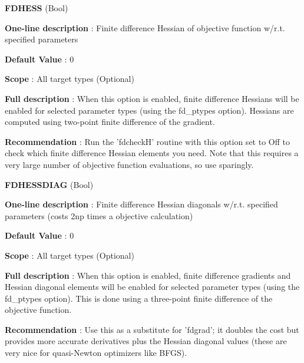 \begin{DoxyItemize}
\item {\bfseries  \-F\-D\-H\-E\-S\-S } (\-Bool) \par
{\bfseries  \-One-\/line description }\-: \-Finite difference \-Hessian of objective function w/r.\-t. specified parameters \par
{\bfseries  \-Default \-Value }\-: 0 \par
{\bfseries  \-Scope }\-: \-All target types (\-Optional) \par
{\bfseries  \-Full description }\-: \-When this option is enabled, finite difference \-Hessians will be enabled for selected parameter types (using the fd\-\_\-ptypes option). \-Hessians are computed using two-\/point finite difference of the gradient. \par
{\bfseries  \-Recommendation }\-: \-Run the 'fdcheck\-H' routine with this option set to \-Off to check which finite difference \-Hessian elements you need. \-Note that this requires a very large number of objective function evaluations, so use sparingly.\end{DoxyItemize}
\begin{DoxyItemize}
\item {\bfseries  \-F\-D\-H\-E\-S\-S\-D\-I\-A\-G } (\-Bool) \par
{\bfseries  \-One-\/line description }\-: \-Finite difference \-Hessian diagonals w/r.\-t. specified parameters (costs 2np times a objective calculation) \par
{\bfseries  \-Default \-Value }\-: 0 \par
{\bfseries  \-Scope }\-: \-All target types (\-Optional) \par
{\bfseries  \-Full description }\-: \-When this option is enabled, finite difference gradients and \-Hessian diagonal elements will be enabled for selected parameter types (using the fd\-\_\-ptypes option). \-This is done using a three-\/point finite difference of the objective function. \par
{\bfseries  \-Recommendation }\-: \-Use this as a substitute for 'fdgrad'; it doubles the cost but provides more accurate derivatives plus the \-Hessian diagonal values (these are very nice for quasi-\/\-Newton optimizers like \-B\-F\-G\-S).\end{DoxyItemize}
